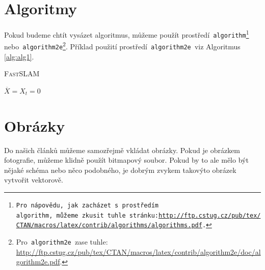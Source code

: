 \documentclass[a4paper, 11pt]{article}
\begin{document}
\section{Algoritmy}\label{sec:alg}
Pokud budeme chtít vysázet algoritmus, můžeme použít prostředí\texttt{ algorithm\footnote{\mbox{Pro nápovědu, jak zacházet s prostředím\texttt{ algorithm,} můžeme zkusit tuhle stránku:}\linebreak \href{http://ftp.cstug.cz/pub/tex/CTAN/macros/latex/contrib/algorithms/algorithms.pdf}{http://ftp.cstug.cz/pub/tex/CTAN/macros/latex/contrib/algorithms/algorithms.pdf}.} } nebo\texttt{ algorithm2e}\footnote{Pro\texttt{ algorithm2e }zase tuhle: \href{http://ftp.cstug.cz/pub/tex/CTAN/macros/latex/contrib/algorithm2e/doc/algorithm2e.pdf}{http://ftp.cstug.cz/pub/tex/CTAN/macros/latex/contrib/algorithm2e/doc/algorithm2e.pdf}.}. Příklad použití prostředí\texttt{ algorithm2e }viz Algoritmus \ref{alg:alg1}. \\

\bigskip

\setlength{\algomargin}{3.25em}
\renewcommand*{\algorithmcfname}{Algoritmus}
\begin{algorithm}[H]\label{alg:alg1}
\caption{\textsc{Fast}SLAM}
\SetAlgoNoLine
\DontPrintSemicolon
\SetNlSty{}{}{:}
\SetNlSkip{0.4em}
\Indm
\BlankLine
\Indp
$\overline{X} = X_t = 0$\;
\;
\end{algorithm}

\vspace{\baselineskip}


\section{Obrázky}
Do našich článků můžeme samozřejmě vkládat obrázky. Pokud je obrázkem fotografie, můžeme klidně použít bitmapový soubor. Pokud by to ale mělo být nějaké schéma nebo něco podobného, je dobrým zvykem takovýto obrázek vytvořit vektorově.
\end{document}

